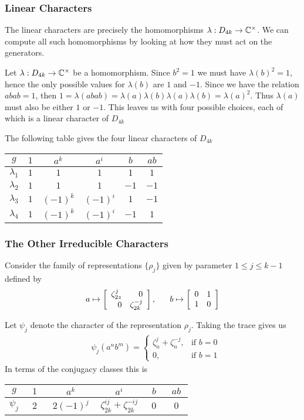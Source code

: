 \subsubsection{Linear Characters}
The linear characters are precisely the homomorphisms $\lambda : D_{4k} \rightarrow \mathbb{C}^\times$. We can compute all 
such homomorphisms by looking at how they must act on the generators. 

Let $\lambda : D_{4k} \rightarrow \mathbb{C}^\times$ be a homomorphism. Since $b^2 = 1$ we must have $\lambda(b)^2 = 1$, 
hence the only possible values for $\lambda(b)$ are $1$ and $-1$. Since we have the relation $abab = 1$, then $1 = 
\lambda(abab) = \lambda(a)\lambda(b)\lambda(a)\lambda(b) = \lambda(a)^2$. Thus $\lambda(a)$ must also be either $1$ 
or $-1$. This leaves us with four possible choices, each of which is a linear character of $D_{4k}$

The following table gives the four linear characters of $D_{4k}$
\begin{center}
\begin{tabular}{c|ccccc}
    $g$ &$1$ & $a^k$ & $a^i$ & $b$ & $ab$ \\ \hline
    $\lambda_1$ & $1$ & $1$ & $1$ & $1$ & $1$ \\
    $\lambda_2$ & $1$ & $1$ & $1$ & $-1$ & $-1$ \\
    $\lambda_3$ & $1$ & $(-1)^k$ & $(-1)^i$ & $1$ & $-1$ \\
    $\lambda_4$ & $1$ & $(-1)^k$ & $(-1)^i$ & $-1$ & $1$ \\
\end{tabular}
\end{center}

\subsubsection{The Other Irreducible Characters}
Consider the family of representations $\{\rho_j\}$ given by parameter $1 \leq j \leq k-1$ defined by
\[
    a \mapsto \left[\begin{array}{rr}\zeta_{2z}^j&0\\0&\zeta_{2k}^{-j}\end{array}\right], \quad \ \ b \mapsto \left[\begin{array}{rr}0&1\\1&0\end{array}\right]
\]

Let $\psi_j$ denote the character of the representation $\rho_j$. Taking the trace gives us
\begin{align*}
    &\psi_j(a^nb^m) = \begin{cases}
        \zeta_n^j + \zeta_n^{-j}, &\text{if } b = 0 \\
        0,                &\text{if } b =1
                    \end{cases}
\end{align*}
In terms of the conjugacy classes this is
\begin{center}
\begin{tabular}{c|ccccc}
    $g$ &$1$ & $a^k$ & $a^i$ & $b$ & $ab$ \\ \hline
    $\psi_j$ & $ \ \ 2 \ \ $ & $\ 2(-1)^j\ $ & $\zeta_{2k}^{ij} + \zeta_{2k}^{-ij}$ & $\ \ 0 \ \ $ & $ \ \ 0 \ \ $
\end{tabular}
\end{center}

